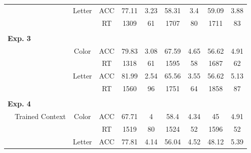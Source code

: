 \documentclass[english,,man,floatsintext]{apa6}
\begin{document}
\begin{table}[htbp]
\begin{tabular}{cccccccccc}
& & \multicolumn{1}{c}{Letter} & \multicolumn{1}{c}{ACC} & \multicolumn{1}{c}{77.11} & \multicolumn{1}{c}{3.23} & \multicolumn{1}{c}{58.31} & \multicolumn{1}{c}{3.4} & \multicolumn{1}{c}{59.09} & \multicolumn{1}{c}{3.88} \\
& & & \multicolumn{1}{c}{RT} & \multicolumn{1}{c}{1309} & \multicolumn{1}{c}{61} & \multicolumn{1}{c}{1707} & \multicolumn{1}{c}{80} & \multicolumn{1}{c}{1711} & \multicolumn{1}{c}{83} \\
\cmidrule(l){2-10}
& & & & & & & & & \\
\multicolumn{2}{l}{\textbf{Exp. 3}}  &   &    &     &     &    &  & & \\
& & \multicolumn{1}{c}{Color} & \multicolumn{1}{c}{ACC} & \multicolumn{1}{c}{79.83} & \multicolumn{1}{c}{3.08} & \multicolumn{1}{c}{67.59} & \multicolumn{1}{c}{4.65} & \multicolumn{1}{c}{56.62} & \multicolumn{1}{c}{4.91} \\
& & & \multicolumn{1}{c}{RT} & \multicolumn{1}{c}{1318} & \multicolumn{1}{c}{61} & \multicolumn{1}{c}{1595} & \multicolumn{1}{c}{58} & \multicolumn{1}{c}{1687} & \multicolumn{1}{c}{62} \\
& & \multicolumn{1}{c}{Letter} & \multicolumn{1}{c}{ACC} & \multicolumn{1}{c}{81.99} & \multicolumn{1}{c}{2.54} & \multicolumn{1}{c}{65.56} & \multicolumn{1}{c}{3.55} & \multicolumn{1}{c}{56.62} & \multicolumn{1}{c}{5.13} \\
& & & \multicolumn{1}{c}{RT} & \multicolumn{1}{c}{1560} & \multicolumn{1}{c}{96} & \multicolumn{1}{c}{1751} & \multicolumn{1}{c}{64} & \multicolumn{1}{c}{1858} & \multicolumn{1}{c}{87} \\
\cmidrule(l){2-10}
 & & & & & & & & & \\
\multicolumn{2}{l}{\textbf{Exp. 4}}  &   &    &     &     &    &  & & \\
& \multicolumn{1}{l}{Trained Context} & \multicolumn{1}{c}{Color} & \multicolumn{1}{c}{ACC} & \multicolumn{1}{c}{67.71} & \multicolumn{1}{c}{4} & \multicolumn{1}{c}{58.4} & \multicolumn{1}{c}{4.34} & \multicolumn{1}{c}{45} & \multicolumn{1}{c}{4.91} \\
& & & \multicolumn{1}{c}{RT} & \multicolumn{1}{c}{1519} & \multicolumn{1}{c}{80} & \multicolumn{1}{c}{1524} & \multicolumn{1}{c}{52} & \multicolumn{1}{c}{1596} & \multicolumn{1}{c}{52} \\
& & \multicolumn{1}{c}{Letter} & \multicolumn{1}{c}{ACC} & \multicolumn{1}{c}{77.81} & \multicolumn{1}{c}{4.14} & \multicolumn{1}{c}{56.04} & \multicolumn{1}{c}{4.52} & \multicolumn{1}{c}{48.12} & \multicolumn{1}{c}{5.39} \\

\end{tabular}
\end{table}
\end{document}
